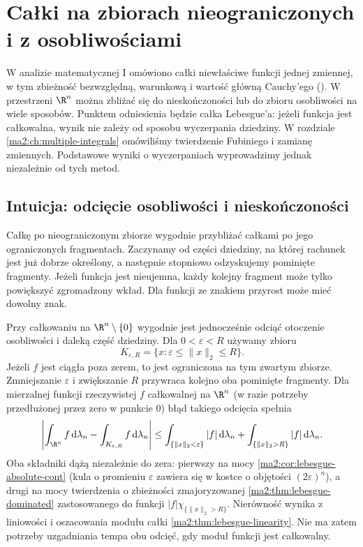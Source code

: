 \chapter{Całki na zbiorach nieograniczonych i z osobliwościami}
\label{ma2:ch:improper-euclidean}

W analizie matematycznej I omówiono całki niewłaściwe
funkcji jednej zmiennej, w tym zbieżność bezwzględną,
warunkową i wartość główną Cauchy'ego
().
W przestrzeni $\R^n$ można zbliżać się do nieskończoności
lub do zbioru osobliwości na wiele sposobów.
Punktem odniesienia będzie całka Lebesgue'a:
jeżeli funkcja jest całkowalna, wynik nie zależy od
sposobu wyczerpania dziedziny.
W rozdziale \ref{ma2:ch:multiple-integrals}
omówiliśmy twierdzenie Fubiniego i zamianę zmiennych.
Podstawowe wyniki o wyczerpaniach wyprowadzimy
jednak niezależnie od tych metod.

\section{Intuicja: odcięcie osobliwości i nieskończoności}

Całkę po nieograniczonym zbiorze wygodnie
przybliżać całkami po jego ograniczonych
fragmentach.
Zaczynamy od części dziedziny, na której
rachunek jest już dobrze określony, a następnie
stopniowo odzyskujemy pominięte fragmenty.
Jeżeli funkcja jest nieujemna, każdy kolejny
fragment może tylko powiększyć zgromadzony
wkład. Dla funkcji ze znakiem przyrost może
mieć dowolny znak.

Przy całkowaniu na $\R^n\setminus\{0\}$
wygodnie jest jednocześnie odciąć
otoczenie osobliwości i daleką część
dziedziny. Dla $0<\varepsilon<R$ używamy
zbioru
\[
 K_{\varepsilon,R}=\{x:\varepsilon\le
 \|x\|_2\le R\}.
\]
Jeżeli $f$ jest ciągła poza zerem, to
jest ograniczona na tym zwartym zbiorze.
Zmniejszanie $\varepsilon$ i zwiększanie
$R$ przywraca kolejno oba pominięte fragmenty.
Dla mierzalnej funkcji rzeczywistej $f$
całkowalnej na $\R^n$ (w razie potrzeby
przedłużonej przez zero w punkcie $0$)
błąd takiego odcięcia
spełnia
\[
 \left|\int_{\R^n}f\,\mathrm d\lambda_n
 -\int_{K_{\varepsilon,R}}f\,\mathrm d\lambda_n\right|
 \le
 \int_{\{\|x\|_2<\varepsilon\}}|f|\,\mathrm d\lambda_n
 +\int_{\{\|x\|_2>R\}}|f|\,\mathrm d\lambda_n.
\]
Oba składniki dążą niezależnie do zera:
pierwszy na mocy
\ref{ma2:cor:lebesgue-absolute-cont}
(kula o promieniu $\varepsilon$ zawiera się
w kostce o objętości $(2\varepsilon)^n$), a drugi
na mocy twierdzenia o zbieżności
zmajoryzowanej \ref{ma2:thm:lebesgue-dominated}
zastosowanego do funkcji
$|f|\chi_{\{\|x\|_2>R\}}$.
Nierówność wynika z liniowości
i oszacowania modułu całki
\ref{ma2:thm:lebesgue-linearity}.
Nie ma zatem potrzeby uzgadniania
tempa obu odcięć, gdy moduł funkcji
jest całkowalny.

